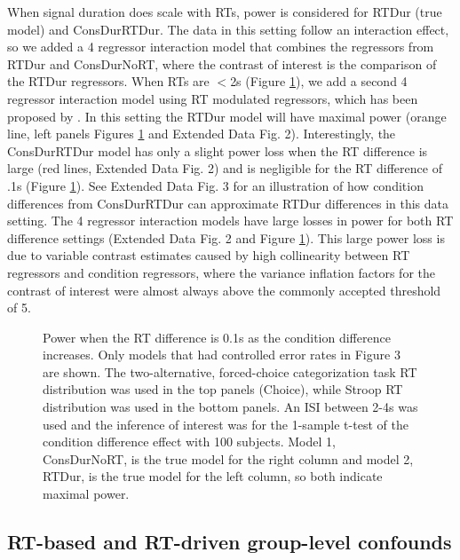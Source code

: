\documentclass[sn-mathphys,Numbered, super, referee, lineno]{sn-jnl}
\begin{document}
When signal duration does scale with RTs, power is considered for RTDur (true model) and ConsDurRTDur. The data in this setting follow an interaction effect, so we added a 4 regressor interaction model that combines the regressors from RTDur and ConsDurNoRT, where the contrast of interest is the comparison of the RTDur regressors. When RTs are $<$2s (Figure \ref{fig:power_rtdiff1}), we add a second 4 regressor interaction model using RT modulated regressors, which has been proposed by \citet{carp_conditional_2010, carpRemovingEffectResponse2012, weissman_congruency_2013}. In this setting the RTDur model will have maximal power (orange line, left panels Figures  \ref{fig:power_rtdiff1} and Extended Data Fig. 2).  Interestingly, the ConsDurRTDur model has only a slight power loss when the RT difference is large (red lines, Extended Data Fig. 2) and is negligible for the RT difference of .1s (Figure \ref{fig:power_rtdiff1}).  See Extended Data Fig. 3 for an illustration of how condition differences from ConsDurRTDur can approximate  RTDur differences in this data setting. The 4 regressor interaction models have large losses in power for both RT difference settings (Extended Data Fig. 2  and Figure \ref{fig:power_rtdiff1}). This large power loss is due to variable contrast estimates caused by high collinearity between RT regressors and condition regressors, where the variance inflation factors for the contrast of interest were almost always above the commonly accepted threshold of 5.



\begin{figure}[ht!]
  \centering
   \caption{Power when the RT difference is 0.1s as the condition difference increases. Only
models that had controlled error rates in Figure 3 are shown. The two-alternative,
forced-choice categorization task RT distribution was used in the top panels (Choice), while
Stroop RT distribution was used in the bottom panels. An ISI between 2-4s was used
and the inference of interest was for the 1-sample t-test of the condition difference
effect with 100 subjects. Model 1, ConsDurNoRT, is the true model for the right column
and model 2, RTDur, is the true model for the left column, so both indicate maximal
power.}
  \label{fig:power_rtdiff1}
\end{figure}




\subsection*{RT-based and RT-driven group-level confounds}
\end{document}
